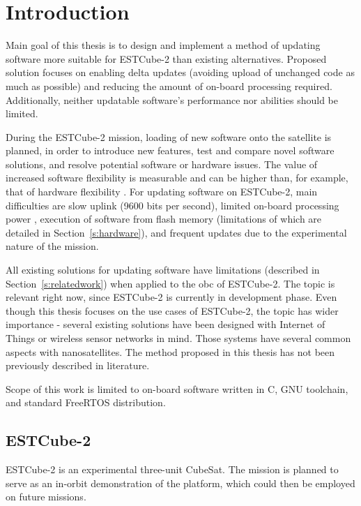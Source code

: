 \newpage
\section{Introduction}

Main goal of this thesis is to design and implement a method of updating software more suitable for ESTCube-2 than existing alternatives. Proposed solution focuses on enabling delta updates (avoiding upload of unchanged code as much as possible) and reducing the amount of on-board processing required. Additionally, neither updatable software’s performance nor abilities should be limited.

During the ESTCube-2 mission, loading of new software onto the satellite is planned, in order to introduce new features, test and compare novel software solutions, and resolve potential software or hardware issues. The value of increased software flexibility is measurable and can be higher than, for example, that of hardware flexibility \cite{Nilchiani2009}. For updating software on ESTCube-2, main difficulties are slow uplink (9600 bits per second), limited on-board processing power \cite{Ehrpais2016}, execution of software from flash memory \cite{Haljaste2017} (limitations of which are detailed in Section~\ref{s:hardware}), and frequent updates due to the experimental nature of the mission.

All existing solutions for updating software have limitations (described in Section~\ref{s:relatedwork}) when applied to the \gls{obc} of ESTCube-2. The topic is relevant right now, since ESTCube-2 is currently in development phase. Even though this thesis focuses on the use cases of ESTCube-2, the topic has wider importance - several existing solutions have been designed with Internet of Things or wireless sensor networks \cite{Dunkels2006,Han2005} in mind. Those systems have several common aspects with nanosatellites. The method proposed in this thesis has not been previously described in literature.

Scope of this work is limited to on-board software written in C, GNU toolchain, and standard FreeRTOS distribution.

\subsection{ESTCube-2}

ESTCube-2 is an experimental three-unit CubeSat. The mission is planned to serve as an in-orbit demonstration of the platform, which could then be employed on future missions. \cite{Iakubivskyi2016}


